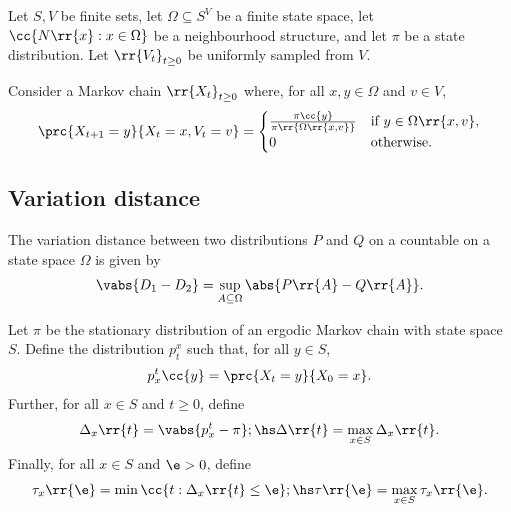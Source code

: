 \documentclass{article}
\begin{document}
\begin{lemma}
  Let $S,V$ be finite sets, let $\Omega\subseteq S^V$ be a finite state space,
  let $\cc{N\rr{x} : x\in\Omega}$ be a neighbourhood structure, and let $\pi$ be a
  state distribution. Let $\rr{V_t}_{t\geq 0}$ be uniformly sampled from $V$.

  Consider a Markov chain $\rr{X_t}_{t\geq 0}$ where, for all $x,y\in\Omega$ and $v\in V$,
  \begin{align*}
    \prc{X_{t+1}=y}{X_t=x, V_t=v} =
    \begin{cases}
      \frac{\pi\cc{y}}{\pi\rr{\Omega\rr{x,v}}} &\text{if $y\in\Omega\rr{x,v}$}, \\
      0 &\text{otherwise}.
    \end{cases}
  \end{align*}
\end{lemma}

\subsection{Variation distance}

\begin{definition}
  The variation distance between two distributions $P$ and $Q$ on a countable
  on a state space $\Omega$ is given by
  \begin{align*}
    \vabs{D_1-D_2}=\sup_{A\subseteq\Omega} \abs{P\rr{A}-Q\rr{A}}.
  \end{align*}
\end{definition}

\begin{definition}
  Let $\pi$ be the stationary distribution of an ergodic Markov chain with state space $S$.
  Define the distribution $p_t^x$ such that, for all $y\in S$,
  \begin{align*}
    p^t_x\cc{y} = \prc{X_t=y}{X_0=x}.
  \end{align*}
  Further, for all $x\in S$ and $t\geq 0$, define
  \begin{align*}
    \Delta_x \rr{t} = \vabs{p_x^t - \pi};\hs
    \Delta\rr{t} = \max_{x\in S}\Delta_x\rr{t}.
  \end{align*}
  Finally, for all $x\in S$ and $\e>0$, define
  \begin{align*}
    \tau_x\rr{\e}=\min\cc{t : \Delta_x\rr{t}\leq\e}; \hs
    \tau\rr{\e} = \max_{x\in S}\tau_x\rr{\e}.
  \end{align*}
\end{definition}
\end{document}
